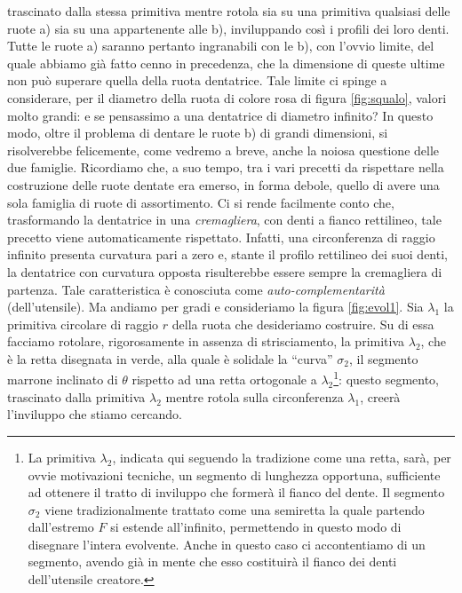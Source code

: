 trascinato dalla stessa primitiva mentre rotola sia su una 
primitiva qualsiasi delle ruote a) sia su una appartenente alle  b), inviluppando cos\`i i profili dei loro denti.
Tutte le ruote a) saranno pertanto
ingranabili con le b), con l'ovvio limite, del quale abbiamo gi\`a
fatto cenno in precedenza, che
la dimensione di queste ultime non pu\`o superare quella della ruota 
dentatrice. Tale limite ci spinge a considerare, per il diametro
della ruota di colore rosa di figura \ref{fig:squalo}, valori molto grandi:
e se pensassimo a una dentatrice di diametro infinito? In questo modo, oltre
il problema di dentare le ruote b) di grandi dimensioni, si risolverebbe
felicemente, come vedremo a breve,
 anche la noiosa questione delle due famiglie. Ricordiamo che,
a suo tempo, tra i vari precetti da rispettare nella costruzione delle ruote
dentate era emerso, in forma debole, quello di avere una sola famiglia
di ruote di assortimento.
Ci si rende facilmente conto che,
trasformando la dentatrice in una 
{\em cremagliera}, con denti a fianco rettilineo,
tale precetto viene automaticamente
rispettato. Infatti, una circonferenza di raggio infinito presenta
curvatura pari a zero e, stante il profilo rettilineo dei suoi denti,
la dentatrice con curvatura opposta risulterebbe essere
sempre la cremagliera di partenza. Tale caratteristica \`e conosciuta
come {\em auto-complementarit\`a}
(dell'utensile).
Ma andiamo per gradi e consideriamo la figura \ref{fig:evol1}.
Sia $\lambda_1$ la primitiva circolare di raggio $r$ della ruota che
desideriamo costruire.
Su di essa facciamo rotolare, rigorosamente in assenza di strisciamento,
la primitiva $\lambda_2$, che \`e la retta disegnata in verde,
alla quale \`e solidale la
``curva'' $\sigma_2$, il segmento marrone inclinato di $\theta$
rispetto ad una retta ortogonale a $\lambda_2$\footnote{
La primitiva $\lambda_2$, indicata qui seguendo la tradizione come una
retta, sar\`a, per ovvie motivazioni tecniche, un segmento di lunghezza opportuna,
sufficiente ad ottenere il tratto di inviluppo che former\`a il fianco
del dente. Il segmento $\sigma_2$ viene tradizionalmente trattato come una
semiretta la quale partendo dall'estremo $F$
si estende all'infinito, permettendo in questo modo di disegnare l'intera
evolvente. Anche in questo caso ci accontentiamo di un segmento, avendo gi\`a in mente
che esso costituir\`a il fianco dei denti dell'utensile creatore.}:
questo segmento, trascinato dalla primitiva $\lambda_2$ mentre
rotola sulla circonferenza $\lambda_1$, 
creer\`a l'inviluppo che stiamo cercando.
